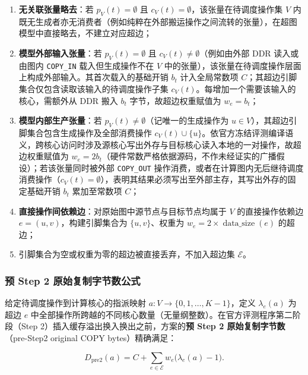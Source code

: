 \documentclass[anonymous,notoc]{gmcm2026}
\providecommand{\tightlist}{\setlength{\itemsep}{0pt}\setlength{\parskip}{0pt}}
\begin{document}
\begin{enumerate}
\def\labelenumi{\arabic{enumi}.}
\tightlist
\item
  \textbf{无关联张量略去}：若 \(p_V(t) = \emptyset\) 且 \(c_V(t) = \emptyset\)，该张量在待调度操作集 \(V\) 内既无生成者亦无消费者（例如纯粹在外部搬运操作之间流转的张量），在超图模型中直接略去，不建立对应超边；
\item
  \textbf{模型外部输入张量}：若 \(p_V(t) = \emptyset\) 且 \(c_V(t) \ne \emptyset\)（例如由外部 DDR 读入或由图内 \texttt{COPY\_IN} 载入但生成操作不在 \(V\) 中的张量），该张量在待调度操作层面上构成外部输入。其首次载入的基础开销 \(b_t\) 计入全局常数项 \(C\)；其超边引脚集合仅包含读取该输入的待调度操作子集 \(c_V(t)\)。每增加一个需要该输入的核心，需额外从 DDR 搬入 \(b_t\) 字节，故超边权重赋值为 \(w_e = b_t\)；
\item
  \textbf{模型内部生产张量}：若 \(p_V(t) \ne \emptyset\)（记唯一的生成操作为 \(u \in V\)），其超边引脚集合包含生成操作及全部消费操作 \(c_V(t) \cup \{u\}\)。依官方冻结评测编译语义，跨核心访问时涉及源核心写出外存与目标核心读入本地的一对操作，故超边权重赋值为 \(w_e = 2b_t\)（硬件常数严格依据源码，不作未经证实的广播假设）；若该张量同时被外部 \texttt{COPY\_OUT} 操作消费，或者在计算图内无后继待调度消费操作（\(c_V(t) = \emptyset\)），表明其结果必须写出至外部主存，其写出外存的固定基础开销 \(b_t\) 累加至常数项 \(C\)；
\item
  \textbf{直接操作间依赖边}：对原始图中源节点与目标节点均属于 \(V\) 的直接操作依赖边 \(e = (u, v)\)，构建引脚集合为 \(\{u, v\}\)、权重为 \(w_e = 2 \times \operatorname{data\_size}(e)\) 的超边；
\item
  引脚集合为空或权重为零的超边被直接丢弃，不加入超边集 \(\mathcal{E}\)。
\end{enumerate}

\subsubsection{预 Step 2 原始复制字节数公式}

给定待调度操作到计算核心的指派映射 \(a: V \to \{0, 1, \dots, K-1\}\)，定义 \(\lambda_e(a)\) 为超边 \(e\) 中全部操作所跨越的不同核心数量（无量纲整数）。在官方评测程序第二阶段（Step 2）插入缓存溢出换入换出之前，方案的\textbf{预 Step 2 原始复制字节数}（pre-Step2 original COPY bytes）精确满足：

\begin{equation}
D_{\mathrm{pre2}}(a) = C + \sum_{e \in \mathcal{E}} w_e \bigl(\lambda_e(a) - 1\bigr).
\end{equation}
\end{document}

